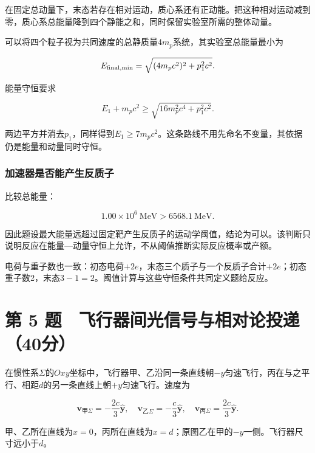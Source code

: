 \documentclass[12pt,a4paper,fontset=fandol]{ctexart}
\begin{document}
在固定总动量下，末态若存在相对运动，质心系还有正动能。把这种相对运动减到零，质心系总能量降到四个静能之和，同时保留实验室所需的整体动量。

可以将四个粒子视为共同速度的总静质量\(4m_p\)系统，其实验室总能量最小为

\[
E_{\rm final,min}
=\sqrt{(4m_pc^2)^2+p_1^2c^2}.
\]

能量守恒要求

\[
E_1+m_pc^2
\geq\sqrt{16m_p^2c^4+p_1^2c^2}.
\]

两边平方并消去\(p_1\)，同样得到\(E_1\geq7m_pc^2\)。这条路线不用先命名不变量，其依据仍是能量和动量同时守恒。

\par\noindent\begin{minipage}{\linewidth}
\subsubsection{加速器是否能产生反质子}\label{ux52a0ux901fux5668ux662fux5426ux80fdux4ea7ux751fux53cdux8d28ux5b50}

比较总能量：

\[
1.00\times10^6\ \mathrm{MeV}
>6568.1\ \mathrm{MeV}.
\]

因此题设最大能量远超过固定靶产生反质子的运动学阈值，结论为可以。该判断只说明反应在能量---动量守恒上允许，不从阈值推断实际反应概率或产额。

电荷与重子数也一致：初态电荷\(+2e\)，末态三个质子与一个反质子合计\(+2e\)；初态重子数2，末态\(3-1=2\)。阈值计算与这些守恒条件共同定义题给反应。

\end{minipage}\par
\clearpage

\section{第 5
题　飞行器间光信号与相对论投递（40分）}\label{ux7b2c-5-ux9898-ux98deux884cux5668ux95f4ux5149ux4fe1ux53f7ux4e0eux76f8ux5bf9ux8bbaux6295ux901240ux5206}

在惯性系\(\Sigma\)的\(Oxy\)坐标中，飞行器甲、乙沿同一条直线朝\(-y\)匀速飞行，丙在与之平行、相距\(d\)的另一条直线上朝\(+y\)匀速飞行。速度为

\[
\mathbf v_{\text{甲}\Sigma}=-\frac{2c}{3}\hat{\mathbf y},
\quad
\mathbf v_{\text{乙}\Sigma}=-\frac c3\hat{\mathbf y},
\quad
\mathbf v_{\text{丙}\Sigma}=\frac{2c}{3}\hat{\mathbf y}.
\]

甲、乙所在直线为\(x=0\)，丙所在直线为\(x=d\)；原图乙在甲的\(-y\)一侧。飞行器尺寸远小于\(d\)。
\end{document}
